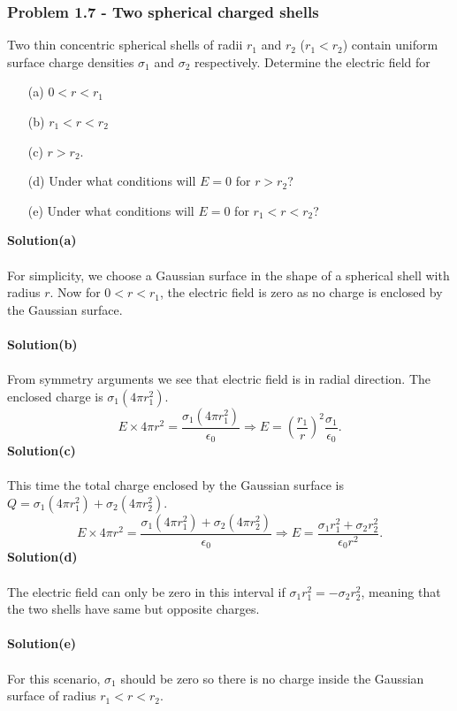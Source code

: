 \documentclass{article}
\begin{document}
\subsubsection*{Problem 1.7 - Two spherical charged shells}
Two thin concentric spherical shells of radii $r_1$ and $r_2$ ($r_1<r_2$) contain uniform surface charge densities $\sigma_1$ and $\sigma_2$ respectively. Determine the electric field for
\begin{enumerate}
    \item[(a)]$0<r<r_1$
    \item[(b)]$r_1<r<r_2$
    \item[(c)]$r>r_2$.
    \item[(d)]Under what conditions will $E=0$ for $r>r_2$?
    \item[(e)]Under what conditions will $E=0$ for $r_1<r<r_2$? 
\end{enumerate}
\textbf{Solution(a)}
\\
\\For simplicity, we choose a Gaussian surface in the shape of a spherical shell with radius $r$. Now for $0<r<r_1$, the electric field is zero as no charge is enclosed by the Gaussian surface.
\\
\\\textbf{Solution(b)}
\\
\\From symmetry arguments we see that electric field is in radial direction. The enclosed charge is $\sigma_1(4\pi r_1^2)$.
\[E\times4\pi r^2=\frac{\sigma_1(4\pi r_1^2)}{\epsilon_0}\Rightarrow E=\left(\frac{r_1}{r}\right)^2\frac{\sigma_1}{\epsilon_0}.\]
\textbf{Solution(c)}
\\
\\This time the total charge enclosed by the Gaussian surface is $Q=\sigma_1(4\pi r_1^2)+\sigma_2(4\pi r_2^2)$.
\[E\times4\pi r^2=\frac{\sigma_1(4\pi r_1^2)+\sigma_2(4\pi r_2^2)}{\epsilon_0}\Rightarrow E=\frac{\sigma_1 r_1^2+\sigma_2 r_2^2}{\epsilon_0r^2}.\]
\textbf{Solution(d)}
\\
\\The electric field can only be zero in this interval if $\sigma_1 r_1^2=-\sigma_2 r_2^2$, meaning that the two shells have same but opposite charges.
\\
\\\textbf{Solution(e)}
\\
\\For this scenario, $\sigma_1$ should be zero so there is no charge inside the Gaussian surface of radius $r_1<r<r_2$.
\end{document}
